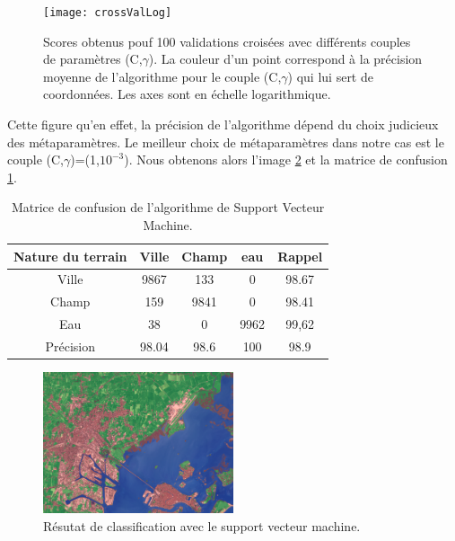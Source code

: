 \documentclass[a4paper,10pt]{article}
\begin{document}
\begin{figure}
  \centering
    \texttt{[image: crossValLog]}
  \caption{Scores obtenus pouf 100 validations croisées avec différents couples de paramètres (C,$\gamma$). La couleur d'un point correspond à la précision moyenne de l'algorithme pour le couple (C,$\gamma$) qui lui sert de coordonnées. Les axes sont en échelle logarithmique.}
  \label{fig:crossMap}
\end{figure}

Cette figure qu'en effet, la précision de l'algorithme dépend du choix judicieux des métaparamètres. Le meilleur choix de métaparamètres dans notre cas est le couple (C,$\gamma$)=(1,$ 10^{-3}$). Nous obtenons alors l'image \ref{fig:veniseSVM} et la matrice de confusion \ref{table:SVC}.

\begin{table}
\begin{center}
 \begin{tabular}{|c|c|c|c|c|}
  \hline
  Nature du terrain & Ville & Champ & eau & Rappel \\
  \hline
Ville & 9867 & 133 & 	0 &	98.67 \\
Champ & 159 &	9841 &	0 &	98.41 \\
Eau &  38 &	0 &	9962 &	99,62 \\
Précision & 98.04 & 98.6 & 100 & 98.9 \\
  \hline
  \end{tabular}
\end{center}
\label{table:SVC}
\caption{Matrice de confusion de l'algorithme de Support Vecteur Machine.}
\end{table}

\begin{figure}
  \centering
    \includegraphics[width=0.5\textwidth]{veniseSVM}
  \caption{Résutat de classification avec le support vecteur machine.}
  \label{fig:veniseSVM}
\end{figure}
\end{document}
